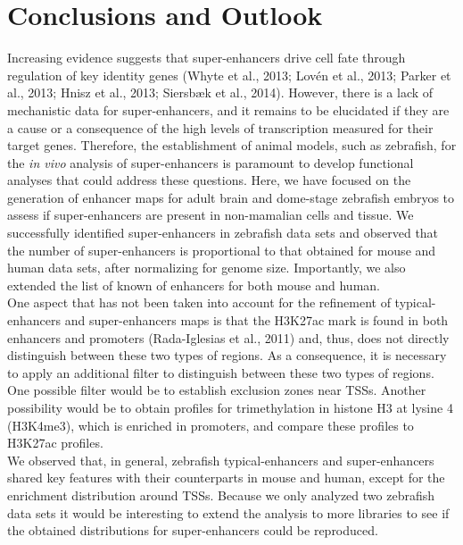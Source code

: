 \section{Conclusions and Outlook}

	Increasing evidence suggests that super-enhancers drive cell fate through regulation of key identity genes (Whyte et al., 2013; Lov\'en et al., 2013; Parker et al., 2013; Hnisz et al., 2013; Siersb\ae k et al., 2014). However, there is a lack of mechanistic data for super-enhancers, and it remains to be elucidated if they are a cause or a consequence of the high levels of transcription measured for their target genes. Therefore, the establishment of animal models, such as zebrafish, for the \textit{in vivo} analysis of super-enhancers is paramount to develop functional analyses that could address these questions. Here, we have focused on the generation of enhancer maps for adult brain and dome-stage zebrafish embryos to assess if super-enhancers are present in non-mamalian cells and tissue. We successfully identified super-enhancers in zebrafish data sets and observed that the number of super-enhancers is proportional to that obtained for mouse and human data sets, after normalizing for genome size. Importantly, we also extended the list of known of enhancers for both mouse and human.\\

	One aspect that has not been taken into account for the refinement of typical-enhancers and super-enhancers maps is that the H3K27ac mark is found in both enhancers and promoters (Rada-Iglesias et al., 2011) and, thus, does not directly distinguish between these two types of regions. As a consequence, it is necessary to apply an additional filter to distinguish between these two types of regions. One possible filter would be to establish exclusion zones near TSSs. Another possibility would be to obtain profiles for trimethylation in histone H3 at lysine 4 (H3K4me3), which is enriched in promoters, and compare these profiles to H3K27ac profiles.\\

	We observed that, in general, zebrafish typical-enhancers and super-enhancers shared key features with their counterparts in mouse and human, except for the enrichment distribution around TSSs. Because we only analyzed two zebrafish data sets it would be interesting to extend the analysis to more libraries to see if the obtained distributions for super-enhancers could be reproduced.\\

